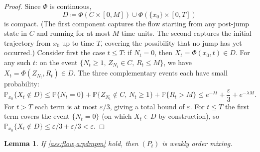 \documentclass[12pt,reqno]{amsart}
\numberwithin{equation}{section}
\newtheorem{lemma}{Lemma}[section]
\theoremstyle{definition}
\newcommand{\1}{\mathbbm{1}}
\newcommand{\PP}{\mathbb P}
\begin{document}
\begin{proof}
    Since $\Phi$ is continuous,
    \begin{equation*}
        D \coloneq \Phi(C \times [0,M]) \cup \Phi(\{x_0\} \times [0,T])
    \end{equation*}
    is compact.  (The first component captures the flow starting from any
    post-jump state in $C$ and running for at most $M$ time units.  The second
    captures the initial trajectory from $x_0$ up to time $T$, covering the
    possibility that no jump has yet occurred.)
    Consider first the case $t \leq T$: if $N_t = 0$, then $X_t = \Phi(x_0, t) \in D$.
    For any such $t$: on the event $\{N_t \geq 1, \, Z_{N_t} \in C, \, R_t \leq M\}$,
    we have $X_t = \Phi(Z_{N_t}, R_t) \in D$.
    The three complementary events each have small probability:
    \begin{equation*}
        \PP_{x_0}\{X_t \notin D\}
        \leq \PP\{N_t = 0\} + \PP\{Z_{N_t} \notin C, \, N_t \geq 1\} + \PP\{R_t > M\}
        \leq e^{-\lambda t} + \frac{\varepsilon}{3} + e^{-\lambda M}.
    \end{equation*}
    For $t > T$ each term is at most $\varepsilon/3$, giving a total bound of
    $\varepsilon$.  For $t \leq T$ the first term covers the event $\{N_t = 0\}$
    (on which $X_t \in D$ by construction), so $\PP_{x_0}\{X_t \notin D\} \leq
    \varepsilon/3 + \varepsilon/3 < \varepsilon$.
\end{proof}

\begin{lemma}\label{l:pdmpwom}
    If \cref{ass:flow,a:pdmpm} hold, then $(P_t)$ is weakly order mixing.
\end{lemma}
\end{document}
